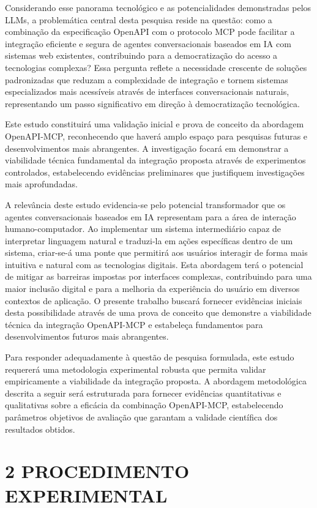 \documentclass[
]{article}
\begin{document}
Considerando esse panorama tecnológico e as potencialidades demonstradas
pelos LLMs, a problemática central desta pesquisa reside na questão:
como a combinação da especificação OpenAPI com o protocolo MCP pode
facilitar a integração eficiente e segura de agentes conversacionais
baseados em IA com sistemas web existentes, contribuindo para a
democratização do acesso a tecnologias complexas? Essa pergunta reflete
a necessidade crescente de soluções padronizadas que reduzam a
complexidade de integração e tornem sistemas especializados mais
acessíveis através de interfaces conversacionais naturais, representando
um passo significativo em direção à democratização tecnológica.

Este estudo constituirá uma validação inicial e prova de conceito da
abordagem OpenAPI-MCP, reconhecendo que haverá amplo espaço para
pesquisas futuras e desenvolvimentos mais abrangentes. A investigação
focará em demonstrar a viabilidade técnica fundamental da integração
proposta através de experimentos controlados, estabelecendo evidências
preliminares que justifiquem investigações mais aprofundadas.

A relevância deste estudo evidencia-se pelo potencial transformador que
os agentes conversacionais baseados em IA representam para a área de
interação humano-computador. Ao implementar um sistema intermediário
capaz de interpretar linguagem natural e traduzi-la em ações específicas
dentro de um sistema, criar-se-á uma ponte que permitirá aos usuários
interagir de forma mais intuitiva e natural com as tecnologias digitais.
Esta abordagem terá o potencial de mitigar as barreiras impostas por
interfaces complexas, contribuindo para uma maior inclusão digital e
para a melhoria da experiência do usuário em diversos contextos de
aplicação. O presente trabalho buscará fornecer evidências iniciais
desta possibilidade através de uma prova de conceito que demonstre a
viabilidade técnica da integração OpenAPI-MCP e estabeleça fundamentos
para desenvolvimentos futuros mais abrangentes.

Para responder adequadamente à questão de pesquisa formulada, este
estudo requererá uma metodologia experimental robusta que permita
validar empiricamente a viabilidade da integração proposta. A abordagem
metodológica descrita a seguir será estruturada para fornecer evidências
quantitativas e qualitativas sobre a eficácia da combinação OpenAPI-MCP,
estabelecendo parâmetros objetivos de avaliação que garantam a validade
científica dos resultados obtidos.

\section{2 PROCEDIMENTO EXPERIMENTAL}\label{procedimento-experimental}
\end{document}
